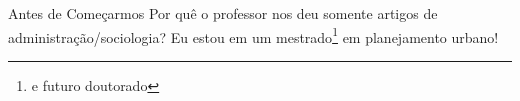 \begin{frame}{Antes de Começarmos}
	Por quê o professor nos deu somente artigos de administração/sociologia?
	Eu estou em um mestrado\footnote{e futuro doutorado} em planejamento urbano!
\end{frame}
